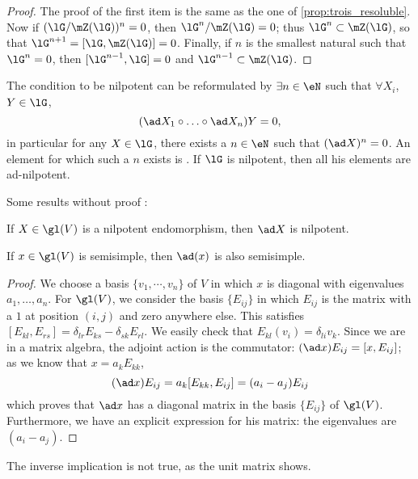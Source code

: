 \begin{proof}
The proof of the first item is the same as the one of \ref{prop:trois_resoluble}. Now if $(\lG/\mZ(\lG))^n=0$, then $\lG^n/\mZ(\lG)=0$; thus $\lG^n\subset\mZ(\lG)$, so that $\lG^{n+1}=[\lG,\mZ(\lG)]=0$. Finally, if $n$ is the smallest natural such that $\lG^n=0$, then $[\lG^{n-1},\lG]=0$ and $\lG^{n-1}\subset\mZ(\lG)$.
\end{proof}

The condition to be nilpotent can be reformulated by $\exists n\in\eN$ such that $\forall X_i$, $Y\in\lG$,
\[
   (\ad X_1\circ\ldots\circ\ad X_n)Y=0,
\]
in particular for any $X\in\lG$, there exists a $n\in\eN$ such that $(\ad X)^n=0$. An element for which such a $n$ exists is . If $\lG$ is nilpotent, then all his elements are ad-nilpotent.

Some results without proof :

\begin{lemma}\label{lem:pre_Engel}
If $X\in\gl(V)$ is a nilpotent endomorphism, then $\ad X$ is nilpotent.
\end{lemma}

\begin{lemma}
If $x\in\gl(V)$ is semisimple, then $\ad(x)$ is also semisimple.
\end{lemma}

\begin{proof}
We choose a basis $\{v_1,\cdots,v_n\}$ of $V$ in which $x$ is diagonal with eigenvalues $a_1,\ldots,a_n$. For $\gl(V)$, we consider the basis $\{E_{ij}\}$ in which $E_{ij}$ is the matrix with a $1$ at position $(i,j)$ and zero anywhere else. This satisfies $[E_{kl},E_{rs}]=\delta_{lr}E_{ks}-\delta_{sk}E_{rl}$. We easily check that $E_{kl}(v_i)=\delta_{li}v_k$. Since we are in a matrix algebra, the adjoint action is the commutator: $(\ad x)E_{ij}=[x,E_{ij}]$; as we know that $x=a_kE_{kk}$, 
\begin{equation}
 (\ad x)E_{ij}=a_k[E_{kk},E_{ij}]=(a_i-a_j)E_{ij}
\end{equation}
which proves that $\ad x$ has a diagonal matrix in the basis $\{E_{ij}\}$ of $\gl(V)$. Furthermore, we have an explicit expression for his matrix: the eigenvalues are $(a_i-a_j)$.
\end{proof}

\begin{remark}
The inverse implication is not true, as the unit matrix shows.
\end{remark}

